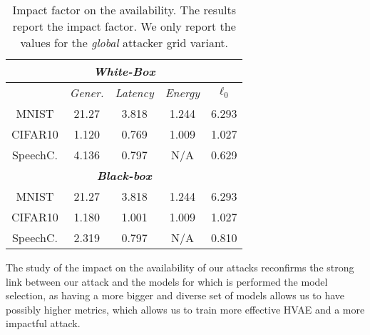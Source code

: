 \begin{table}[!htpb]
\centering
\footnotesize
\caption{Impact factor on the availability. The results report the impact factor. We only report the values for the \textit{global} attacker grid variant. }
\begin{tabular}{c|c|c|c|c}  \toprule
\multicolumn{5}{c}{\textit{\textbf{White-Box}}} \\ \midrule
 &\textit{Gener.} & \textit{Latency} & \textit{Energy} & \textit{$\ell_0$} \\ \midrule
MNIST  & 21.27 & 3.818 & 1.244 & 6.293 \\
CIFAR10 & 1.120 & 0.769 & 1.009 & 1.027 \\
SpeechC. & 4.136 & 0.797 & N/A & 0.629 \\ \midrule
\multicolumn{5}{c}{\textit{\textbf{Black-box}}} \\ \midrule
MNIST  & 21.27 & 3.818 & 1.244 & 6.293 \\
CIFAR10 & 1.180 & 1.001 & 1.009 & 1.027 \\
SpeechC. & 2.319 & 0.797 & N/A & 0.810 \\ \bottomrule
\end{tabular}
\label{tab.impact}
\end{table}

The study of the impact on the availability of our attacks reconfirms the strong link between our attack and the models for which is performed the model selection, as having a more bigger and diverse set of models allows us to have possibly higher metrics, which allows us to train more effective HVAE and a more impactful attack.

